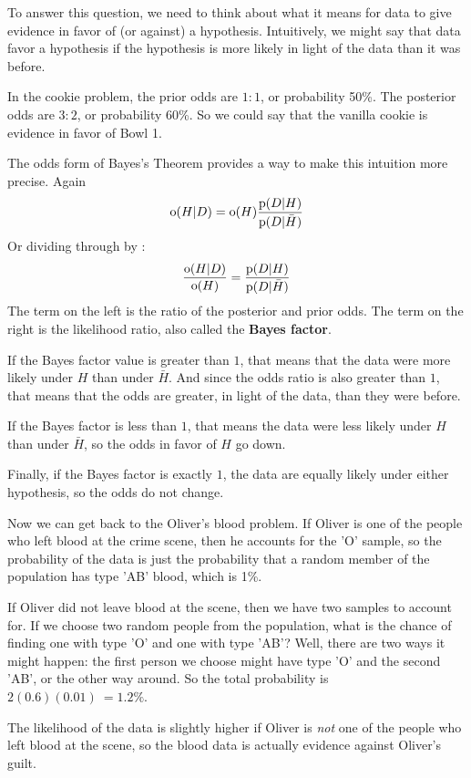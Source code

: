 \documentclass[12pt]{book}
\begin{document}
To answer this question, we need to think about what it means
for data to give evidence in favor of (or against) a hypothesis.
Intuitively, we might say that data favor a hypothesis if the
hypothesis is more likely in light of the data than it was before.

In the cookie problem, the prior odds are $1:1$, or probability 50\%.
The posterior odds are $3:2$, or probability 60\%.  So we could say
that the vanilla cookie is evidence in favor of Bowl 1.

The odds form of Bayes's Theorem provides a way to make this
intuition more precise.  Again
%
\[ \mathrm{o}(H|D) = \mathrm{o}(H) \frac{\mathrm{p}(D|H)}{\mathrm{p}(D|\bar{H})} \]
%
Or dividing through by :
%
\[ \frac{\mathrm{o}(H|D)}{\mathrm{o}(H)} = \frac{\mathrm{p}(D|H)}{\mathrm{p}(D|\bar{H})} \]
%
The term on the left is the ratio of the posterior and prior odds.
The term on the right is the likelihood ratio, also called the {\bf Bayes
factor}.

If the Bayes factor value is greater than $1$, that means that the
data were more likely under $H$ than under $\bar{H}$.  And since the
odds ratio is also greater than $1$, that means that the odds are
greater, in light of the data, than they were before.

If the Bayes factor is less than $1$, that means the data were
less likely under $H$ than under $\bar{H}$, so the odds in
favor of $H$ go down.

Finally, if the Bayes factor is exactly $1$, the data are equally
likely under either hypothesis, so the odds do not change.

Now we can get back to the Oliver's blood problem.  If Oliver is
one of the people who left blood at the crime scene, then he
accounts for the 'O' sample, so the probability of the data
is just the probability that a random member of the population
has type 'AB' blood, which is 1\%.

If Oliver did not leave blood at the scene, then we have two
samples to account for.  If we choose two random people from
the population, what is the chance of finding one with type 'O'
and one with type 'AB'?  Well, there are two ways it might happen:
the first person we choose might have type 'O' and the second
'AB', or the other way around.  So the total probability is
$2 (0.6) (0.01)\ = 1.2\%$.

The likelihood of the data is slightly higher if Oliver is
{\it not} one of the people who left blood at the scene, so
the blood data is actually evidence against Oliver's guilt.
\end{document}
